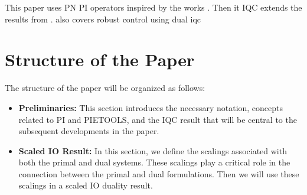 
This paper uses PN PI operators inspired by the works \cite{venkataraman, hu, magicalhiddenenergy}. Then it IQC extends the results from \cite{10156335, 9303892, lenssen2025muanalysissynthesisframeworkpartial}. \cite{kose2009robust} also covers robust control using dual iqc

\section*{Structure of the Paper}

The structure of the paper will be organized as follows:

\begin{itemize}
	\item \textbf{Preliminaries:} This section introduces the necessary notation, concepts related to PI and PIETOOLS, and the IQC result that will be central to the subsequent developments in the paper.

	\item \textbf{Scaled IO Result:} In this section, we define the scalings associated with both the primal and dual systems. These scalings play a critical role in the connection between the primal and dual formulations. Then we will use these scalings in a scaled IO duality result.


\end{itemize}
